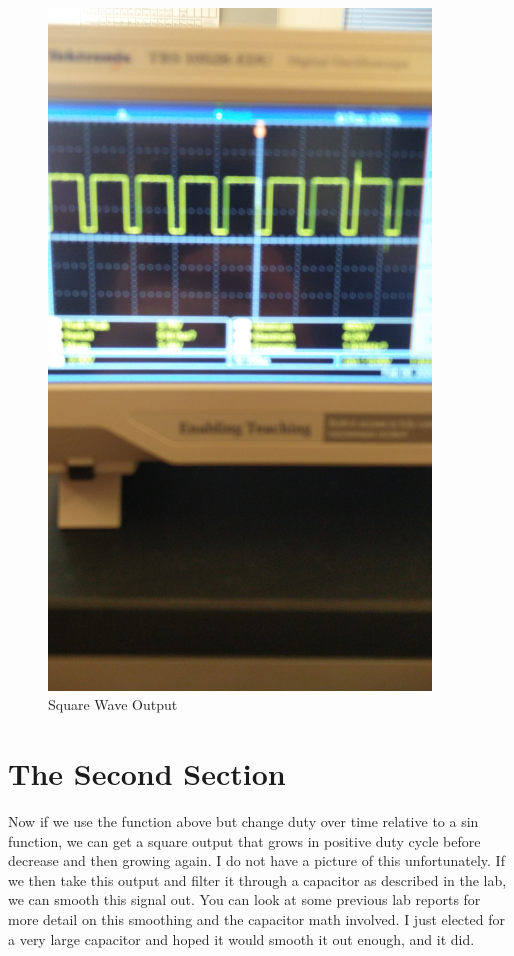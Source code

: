\documentclass[prb,preprint]{revtex4-1}
\begin{document}
\begin{figure}[ht]
	\centering
	\includegraphics[width=4in]{square.jpg}
	\caption{Square Wave Output}
	\label{fig1}
\end{figure}


\section{The Second Section}
Now if we use the function above but change duty over time relative to a sin function, we can get a square output that grows in positive duty cycle before decrease and then growing again. I do not have a picture of this unfortunately. If we then take this output and filter it through a capacitor as described in the lab, we can smooth this signal out. You can look at some previous lab reports for more detail on this smoothing and the capacitor math involved. I just elected for a very large capacitor and hoped it would smooth it out enough, and it did.
\end{document}
